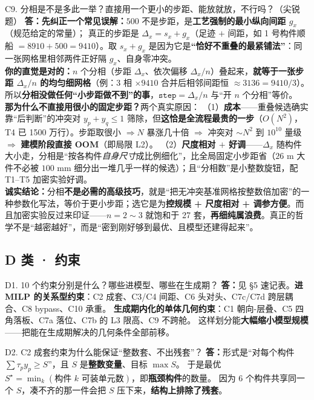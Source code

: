 \documentclass[11pt]{ctexart}
\newcommand{\A}{\textbf{答：}}
\begin{document}
\begin{qa}{C9. 分相是不是多此一举？直接用一个更小的步距、能放就放，不行吗？（尖锐题）}
\A \textbf{先纠正一个常见误解：}$500$ 不是步距，是\textbf{工艺强制的最小纵向间距 $g_x$}（规范给定的常量）；
真正的步距是 $\Delta_x=s_x+g_x$（足迹 $+$ 间距，如 1 号构件顺船 $=8910{+}500{=}9410$）。取 $s_x{+}g_x$ 是因为它是\textbf{“恰好不重叠的最紧铺法”}：同一张网格里相邻两件正好隔 $g_x$、自身零冲突。\\[2pt]
\textbf{你的直觉是对的：}$n$ 个分相（步距 $\Delta_x$、依次偏移 $\Delta_x/n$）叠起来，\textbf{就等于一张步距 $\Delta_x/n$ 的均匀细网格}（例：$3$ 相 $\times9410$ 合并后相邻间距恒 $\approx3136=9410/3$）。所以\textbf{分相没做任何“小步距做不到”的事}，$\texttt{step}{=}\Delta_x/n$ 与“开 $n$ 个分相”等价。\\[2pt]
\textbf{那为什么不直接用很小的固定步距？}两个真实原因：
（1）\textbf{成本}——重叠候选确实靠“后判断”的冲突对 $y_p{+}y_q\le1$ 筛除，但\textbf{这恰是全流程最贵的一步}（$O(N^2)$，T4 已 1500 万行）。步距取很小 $\Rightarrow N$ 暴涨几十倍 $\Rightarrow$ 冲突对 $\sim N^2$ 到 $10^{10}$ 量级 $\Rightarrow$ \textbf{建模阶段直接 OOM}（即局限 L2）。
（2）\textbf{尺度相对 $+$ 好调}——$\Delta_x$ 随构件大小走，分相是“按各构件\emph{自身尺寸}成比例细化”，比全局固定小步距省（$26$ m 大件不必被 $100$ mm 细分出一堆几乎一样的候选）；且“分相数”是小整数旋钮，配 T1--T5 加密实验好调。\\[2pt]
\textbf{诚实结论：}分相\textbf{不是必需的高级技巧}，就是“把无冲突基准网格按整数倍加密”的一种参数化写法，等价于更小步距；选它是为\textbf{控规模 + 尺度相对 + 调参方便}。而且加密实验反过来印证——$n{=}2\!\sim\!3$ 就饱和于 27 套，\textbf{再细纯属浪费}。真正的哲学不是“越密越好”，而是“密到刚好够到最优、且模型还建得起来”。
\end{qa}

\subsection{D 类 · 约束}

\begin{qa}{D1. 10 个约束分别是什么？哪些进模型、哪些在生成期？}
\A 见 \S5 速记表。\textbf{进 MILP 的关系型约束}：C2 成套、C3/C4 间距、C6 头对头、C7c/C7d 跨层耦合、C8 bypass、C10 承重。
\textbf{生成期内化的单体几何约束}：C1 朝向-层叠、C5 四角落板、C7a 落位、C7b 的 L3 限高、C9 不跨舱。
这样划分能\textbf{大幅缩小模型规模}——把能在生成期解决的几何条件全部前移。
\end{qa}

\begin{qa}{D2. C2 成套约束为什么能保证“整数套、不出残套”？}
\A 形式是“对每个构件 $\sum\tau_p y_p\ge S$”，且 $S$ 是\textbf{整数变量}、目标 $\max S$。
于是最优 $S^\star=\min_k(\text{构件 }k\text{ 可装单元数})$，即\textbf{瓶颈构件}的数量。
因为 6 个构件共享同一个 $S$，凑不齐的那一件会把 $S$ 压下来，\textbf{结构上排除了残套}。
\end{qa}
\end{document}
